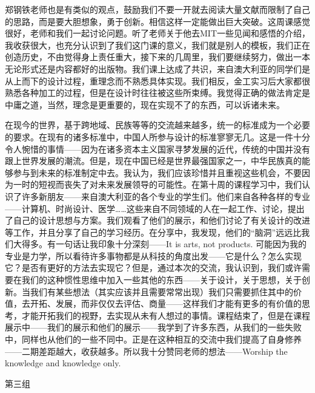 \documentclass[11pt,fleqn]{book}
\makeatletter
\numberwithin{dummy}{section}
\theoremstyle{ocrenumbox}
\theoremstyle{blacknumex}
\theoremstyle{blacknumbox}
\theoremstyle{ocrenum}
\newenvironment{remark}[1]{\par\vspace{10pt}\small %
	\begin{list}{}{
			\leftmargin=35pt %
			\rightmargin=25pt}\item\ignorespaces %
		\makebox[-2.5pt]{\begin{tikzpicture}[overlay]
			\node[draw=ocre!60,line width=1pt,circle,fill=ocre!25,font=\sffamily\bfseries,inner sep=2pt,outer sep=0pt] at (-15pt,0pt){\textcolor{ocre}{#1}};\end{tikzpicture}} %
		\advance\baselineskip -1pt}{\end{list}\vskip5pt} %
\renewcommand{\subsection}{\@startsection {subsection}{2}{\z@}
	{-3ex \@plus -0.1ex \@minus -.4ex}
	{0.5ex \@plus.2ex }
	{\normalfont\sffamily\bfseries}}
\newlength\esp
\makeatother
\begin{document}
\begin{remark}{黄}
	郑钢铁老师也是有类似的观点，鼓励我们不要一开就去阅读大量文献而限制了自己的思路，而是要大胆想象，勇于创新。相信这样一定能做出巨大突破。这周课感觉很好，老师和我们一起讨论问题。听了老师关于他去MIT一些见闻和感悟的介绍，我收获很大，也充分认识到了我们这门课的意义，我们就是别人的模板，我们正在创造历史，不由觉得身上责任重大，接下来的几周里，我们要继续努力，做出一本无论形式还是内容都好的出版物。我们课上达成了共识，来自澳大利亚的同学们是从上而下的设计过程，重理念而不熟悉具体实现。我们相反，金工实习后大家都很熟悉各种加工的过程，但是在设计时往往被这些所束缚。我觉得正确的做法肯定是中庸之道，当然，理念是更重要的，现在实现不了的东西，可以诉诸未来。
\end{remark}

\begin{remark}{康}
	在现今的世界，基于跨地域、民族等等的交流越来越多，统一的标准成为一个必要的要求。在现有的诸多标准中，中国人所参与设计的标准寥寥无几。这是一件十分令人惋惜的事情——因为在诸多资本主义国家寻梦发展的近代，传统的中国并没有跟上世界发展的潮流。但是，现在中国已经是世界最强国家之一，中华民族真的能够参与到未来的标准制定中去。我认为，我们应该珍惜并且重视这些机会，不要因为一时的短视而丧失了对未来发展领导的可能性。在第十周的课程学习中，我们认识了许多新朋友——来自澳大利亚的各个专业的学生们。他们来自各种各样的专业——计算机、时尚设计、医学……这些来自不同领域的人在一起工作、讨论，提出了自己的设计思想与方案。我们观看了他们的展示，和他们讨论了有关设计的改进等工作，并且分享了自己的学习经历。在分享中，我发现，他们的“脑洞”远远比我们大得多。有一句话让我印象十分深刻——It is arts, not products. 可能因为我的专业是力学，所以看待许多事物都是从科技的角度出发——它是什么？怎么实现它？是否有更好的方法去实现它？但是，通过本次的交流，我认识到，我们或许需要在我们的这种惯性思维中加入一些其他的东西——关于设计，关于思想，关于创新。当我们有某些想法（其实应该并且需要常常出现）我们只需要抓住其中的价值，去开拓、发展，而非仅仅去评估、商量——这样我们才能有更多的有价值的思考，才能开拓我们的视野，去实现从未有人想过的事情。课程结束了，但是在课程展示中——我们的展示和他们的展示——我学到了许多东西，从我们的一些失败中，同样也从他们的一些不同中。正是在这种相互的交流中我们提高了自身修养——二期差距越大，收获越多。所以我十分赞同老师的想法——Worship the knowledge and knowledge only.
\end{remark}

\subsection{第三组}
\end{document}
